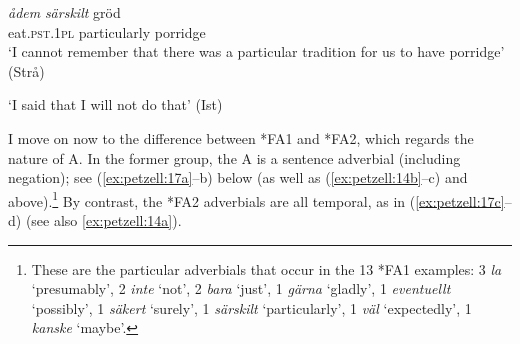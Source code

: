\documentclass[output=paper,colorlinks,citecolor=brown,draft,draftmode]{langscibook}
\begin{document}
\ea\label{ex:petzell:15}

\gll \textit{ådem} \textit{särskilt}      gröd   \\
     eat.\textsc{pst}.1\textsc{pl}    particularly    porridge\\
\glt `I cannot remember that there was a particular tradition for us to have porridge’ (Strå)  \\


\glt `I said that I will not do that’ (Ist)
\z
\z

\ea\label{ex:petzell:16}
    

\z
\z


I move on now to the difference between *FA1 and *FA2, which regards the nature of A. In the former group, the A is a sentence adverbial (including negation); see (\ref{ex:petzell:17a}–b) below (as well as (\ref{ex:petzell:14b}–c) and  above).\footnote{These are the particular adverbials that occur in the 13 *FA1 examples: 3 \textit{la} `presumably’, 2 \textit{inte} ‘not’, 2 \textit{bara} ‘just’, 1 \textit{gärna} ‘gladly’, 1 \textit{eventuellt} ‘possibly’, 1 \textit{säkert} ‘surely’, 1 \textit{särskilt} ‘particularly’, 1 \textit{väl} ‘expectedly’, 1 \textit{kanske} ‘maybe’.} By contrast, the *FA2 adverbials are all temporal, as in (\ref{ex:petzell:17c}–d) (see also \ref{ex:petzell:14a}).{}
\end{document}
